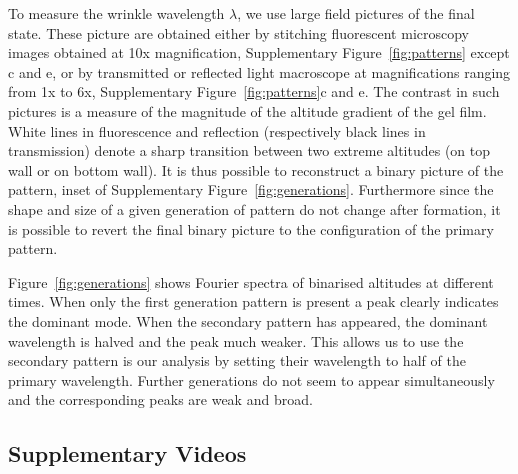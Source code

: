 \documentclass[twocolumn,superscriptaddress,showpacs,preprintnumbers,
amsmath,amssymb,prl]{revtex4-1}
\begin{document}
To measure the wrinkle wavelength $\lambda$, we use large field pictures of the final state. These picture are obtained either by stitching fluorescent microscopy images obtained at 10x magnification, Supplementary Figure~\ref{fig:patterns} except c and e, or by transmitted or reflected light macroscope at magnifications ranging from 1x to 6x, Supplementary Figure~\ref{fig:patterns}c and e. The contrast in such pictures is a measure of the magnitude of the altitude gradient of the gel film. White lines in fluorescence and reflection (respectively black lines in transmission) denote a sharp transition between two extreme altitudes (on top wall or on bottom wall). It is thus possible to reconstruct a binary picture of the pattern, inset of Supplementary Figure~\ref{fig:generations}. Furthermore since the shape and size of a given generation of pattern do not change after formation, it is possible to revert the final binary picture to the configuration of the primary pattern.

Figure~\ref{fig:generations} shows Fourier spectra of binarised altitudes at different times. When only the first generation pattern is present a peak clearly indicates the dominant mode. When the secondary pattern has appeared, the dominant wavelength is halved and the peak much weaker. This allows us to use the secondary pattern is our analysis by setting their wavelength to half of the primary wavelength. Further generations do not seem to appear simultaneously and the corresponding peaks are weak and broad.


\subsection*{Supplementary Videos}
\end{document}
